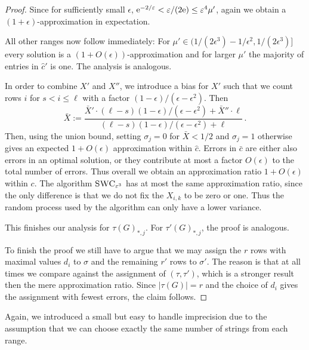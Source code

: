\begin{proof}
Since for sufficiently small $\epsilon$, $\textrm{e}^{-2/\varepsilon} < \varepsilon/(2\textrm{e}) \le \varepsilon^4 \mu'$,
again we obtain a $(1+\epsilon)$-approximation in expectation.

All other ranges now follow immediately:
For $\mu' \in (1/(2\epsilon^3) - 1/\epsilon^2,1/(2\epsilon^3)]$ every solution is a $(1+O(\epsilon))$-approximation and for larger $\mu'$ the majority of entries in $\hat{c}'$ is one.
The analysis is analogous.

In order to combine $X'$ and $X''$, we introduce a bias for $X'$ such that we count rows $i$ for $s < i \le \ell$ with a factor $(1-\epsilon)/(\epsilon - \epsilon^2)$.
Then
\[
    \bar{X} := \frac{\bar{X}' \cdot (\ell-s)(1-\epsilon)/(\epsilon - \epsilon^2) + \bar{X}'' \cdot \ell}{(\ell-s)(1-\epsilon)/(\epsilon - \epsilon^2) + \ell}\,.
\]
Then, using the union bound, setting $\sigma_j = 0$ for $\bar{X} < 1/2$ and $\sigma_j = 1$ otherwise gives an expected $1+O(\epsilon)$ approximation within $\hat{c}$.
Errors in $\bar{c}$ are either also errors in an optimal solution, or they contribute at most a factor $O(\epsilon)$ to the total number of errors.
Thus overall we obtain an approximation ratio $1+O(\epsilon)$ within $c$.
The algorithm $\textsc{SWC}_{\varepsilon^3}$ has at most the same approximation ratio, since the only difference is that we do not fix the $X_{i,k}$ to be zero or one.
Thus the random process used by the algorithm can only have a lower variance.

This finishes our analysis for $\tau(G)_{*,j}$.
For $\tau'(G)_{*,j}$, the proof is analogous.

To finish the proof we still have to argue that we may assign the $r$ rows with maximal values $d_i$ to $\sigma$ and the remaining $r'$ rows to $\sigma'$.
The reason is that at all times we compare against the assignment of $(\tau,\tau')$, which is a stronger result then the mere approximation ratio.
Since $|\tau(G)|=r$ and the choice of $d_i$ gives the assignment with fewest errors, the claim follows.
\end{proof}

Again, we introduced a small but easy to handle imprecision due to the assumption that we can choose exactly the same number of strings from each range.



